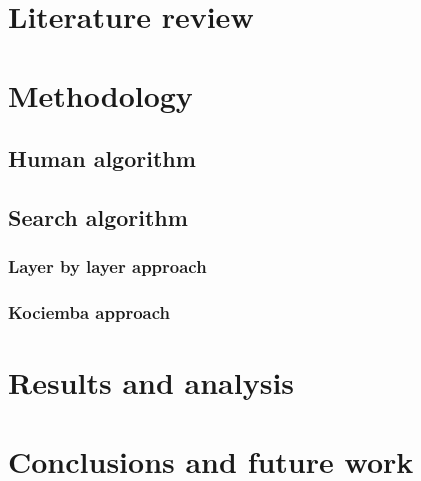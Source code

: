\documentclass[12pt]{report} %
\begin{document}
\section{Literature review}

\newpage
\section{Methodology}
    
\subsection{Human algorithm}

\subsection{Search algorithm}
\subsubsection{Layer by layer approach}
\subsubsection{Kociemba approach}

\newpage
\section{Results and analysis}

\newpage
\section{Conclusions and future work}

\printbibliography
\end{document}

